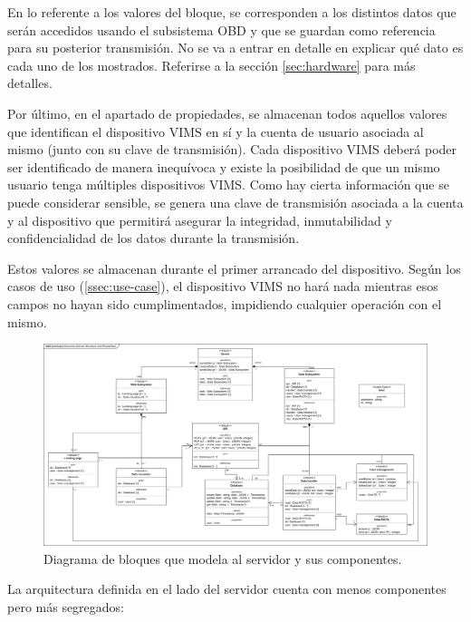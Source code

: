 En lo referente a los valores del bloque, se corresponden a los distintos datos que
serán accedidos usando el subsistema \ac{OBD} y que se guardan como referencia para
su posterior transmisión. No se va a entrar en detalle en explicar qué dato es cada
uno de los mostrados. Referirse a la sección \ref{sec:hardware} para más detalles.

Por último, en el apartado de propiedades, se almacenan todos aquellos valores
que identifican el dispositivo \ac{VIMS} en sí y la cuenta de usuario asociada
al mismo (junto con su clave de transmisión). Cada dispositivo \ac{VIMS} deberá
poder ser identificado de manera inequívoca y existe la posibilidad de que un mismo
usuario tenga múltiples dispositivos \ac{VIMS}. Como hay cierta información que
se puede considerar sensible, se genera una clave de transmisión asociada a la
cuenta y al dispositivo que permitirá asegurar la integridad, inmutabilidad y
confidencialidad de los datos durante la transmisión.

Estos valores se almacenan durante el primer arrancado del dispositivo. Según los
casos de uso (\ref{ssec:use-case}), el dispositivo \ac{VIMS} no hará nada mientras
esos campos no hayan sido cumplimentados, impidiendo cualquier operación con el
mismo.

\begin{figure}[H]
  \centering
  \includegraphics[width=\linewidth]{images/BlockDiagrams-Server.drawio.png}
  \caption{Diagrama de bloques que modela al servidor y sus componentes.}
  \label{bd:server}
\end{figure}

La arquitectura definida en el lado del servidor cuenta con menos componentes pero
más segregados:

